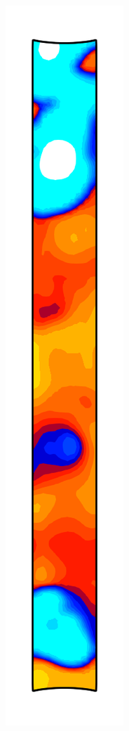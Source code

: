 \begin{figure}[!htb]
  \centering
  \begin{subfigure}{0.08\textwidth}
    \centering
    \includegraphics[width=\textwidth]{Chapter5/figures/spallation/c_1}

\end{subfigure}
\end{figure}

